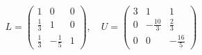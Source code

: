 \documentclass[preview]{standalone}
\begin{document}
\begin{align*}
L = \begin{pmatrix}1 & 0 & 0 \\\frac{1}{3} & 1 & 0 \\\frac{1}{3} & -\frac{1}{5} & 1\end{pmatrix}, \quad U = \begin{pmatrix}3 & 1 & 1 \\0 & -\frac{10}{3} & \frac{2}{3} \\0 & 0 & -\frac{16}{5}\end{pmatrix}
\end{align*}
\end{document}
